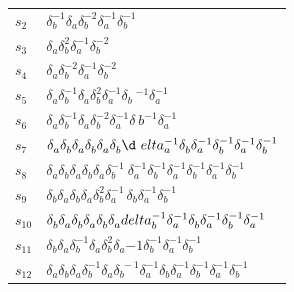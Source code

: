 \documentclass{article}
\begin{document}
\begin{center}
\begin{tabular}{ll}
$s_{2}$ & $\delta_b^{-1}\delta_a^{}\delta_b^{-2}\delta_a^{-1}\delta_b^{-1}$ \\
$s_{3}$ & $\delta_a^{}\delta_b^{2}\delta_a^{-1}\delta_b^{-2}$ \\
$s_{4}$ & $\delta_a^{}\delta_b^{-2}\delta_a^{-1}\delta_b^{-2}$ \\
$s_{5}$ & $\delta_a^{}\delta_b^{-1}\delta_a^{}\delta_b^{2}\delta_a^{-1}\delta_b\
^{-1}\delta_a^{-1}$ \\
$s_{6}$ & $\delta_a^{}\delta_b^{-1}\delta_a^{}\delta_b^{-2}\delta_a^{-1}\delta_\
b^{-1}\delta_a^{-1}$ \\
$s_{7}$ & $\delta_a^{}\delta_b^{}\delta_a^{}\delta_b^{}\delta_a^{}\delta_b^{}\d\
elta_a^{-1}\delta_b^{}\delta_a^{-1}\delta_b^{-1}\delta_a^{-1}\delta_b^{-1}$ \\
$s_{8}$ & $\delta_a^{}\delta_b^{}\delta_a^{}\delta_b^{}\delta_a^{}\delta_b^{-1}\
\delta_a^{-1}\delta_b^{-1}\delta_a^{-1}\delta_b^{-1}\delta_a^{-1}\delta_b^{-1}$ 
\\
$s_{9}$ & $\delta_b^{}\delta_a^{}\delta_b^{}\delta_a^{}\delta_b^{2}\delta_a^{-1\
}\delta_b^{}\delta_a^{-1}\delta_b^{-1}$ \\
$s_{10}$ & $\delta_b^{}\delta_a^{}\delta_b^{}\delta_a^{}\delta_b^{}\delta_a^{}\\
delta_b^{-1}\delta_a^{-1}\delta_b^{}\delta_a^{-1}\delta_b^{-1}\delta_a^{-1}$ \\
$s_{11}$ & $\delta_b^{}\delta_a^{}\delta_b^{-1}\delta_a^{}\delta_b^{2}\delta_a^\
{-1}\delta_b^{-1}\delta_a^{-1}\delta_b^{-1}$ \\
$s_{12}$ & $\delta_a^{}\delta_b^{}\delta_a^{}\delta_b^{-1}\delta_a^{}\delta_b^{\
-1}\delta_a^{-1}\delta_b^{}\delta_a^{-1}\delta_b^{-1}\delta_a^{-1}\delta_b^{-1}\
$ \\
\bottomrule
\end{tabular}
\end{center}

\thispagestyle{empty}
\end{document}
